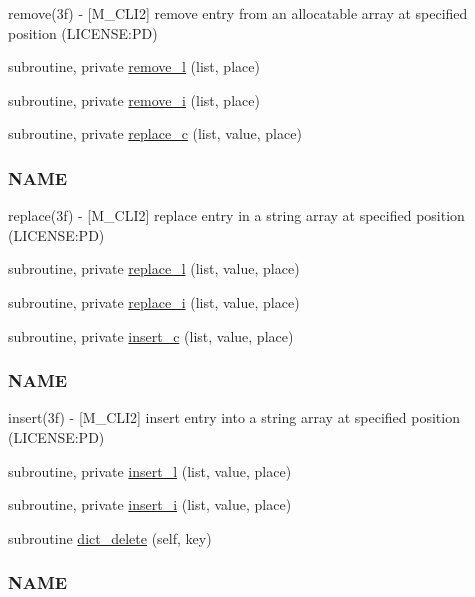 \begin{DoxyCompactItemize}
\begin{DoxyCompactList}
remove(3f) -\/ \mbox{[}M\+\_\+\+C\+L\+I2\mbox{]} remove entry from an allocatable array at specified position (L\+I\+C\+E\+N\+SE\+:PD) \end{DoxyCompactList}\item 
subroutine, private \mbox{\hyperlink{namespacem__cli2_ae3fc38d25a8a4892bde95a7198c2495a}{remove\+\_\+l}} (list, place)
\item 
subroutine, private \mbox{\hyperlink{namespacem__cli2_a1c2bd26b3c04a499cc65b00133dfe6b9}{remove\+\_\+i}} (list, place)
\item 
subroutine, private \mbox{\hyperlink{namespacem__cli2_affd644ac84d1010b40748f80d142d6b3}{replace\+\_\+c}} (list, value, place)
\begin{DoxyCompactList}\small\item\em \subsubsection*{N\+A\+ME}

replace(3f) -\/ \mbox{[}M\+\_\+\+C\+L\+I2\mbox{]} replace entry in a string array at specified position (L\+I\+C\+E\+N\+SE\+:PD) \end{DoxyCompactList}\item 
subroutine, private \mbox{\hyperlink{namespacem__cli2_ae4a1802207f6b67e36cbf89003d6fb55}{replace\+\_\+l}} (list, value, place)
\item 
subroutine, private \mbox{\hyperlink{namespacem__cli2_a0a591fd55e8010f26eb6f9f6bafc1ddb}{replace\+\_\+i}} (list, value, place)
\item 
subroutine, private \mbox{\hyperlink{namespacem__cli2_ab3f2aa827b3b7ff419bcdc3ccb2672b3}{insert\+\_\+c}} (list, value, place)
\begin{DoxyCompactList}\small\item\em \subsubsection*{N\+A\+ME}

insert(3f) -\/ \mbox{[}M\+\_\+\+C\+L\+I2\mbox{]} insert entry into a string array at specified position (L\+I\+C\+E\+N\+SE\+:PD) \end{DoxyCompactList}\item 
subroutine, private \mbox{\hyperlink{namespacem__cli2_a7e5ee66813d8f6db9d48ebdc350a6b3e}{insert\+\_\+l}} (list, value, place)
\item 
subroutine, private \mbox{\hyperlink{namespacem__cli2_afa6f00a57f1252ba5daa0c440a23ffbb}{insert\+\_\+i}} (list, value, place)
\item 
subroutine \mbox{\hyperlink{namespacem__cli2_afcdd2c59305faf341ebf8ec3b115a05e}{dict\+\_\+delete}} (self, key)
\begin{DoxyCompactList}\small\item\em \subsubsection*{N\+A\+ME}


\end{DoxyCompactList}
\end{DoxyCompactItemize}
